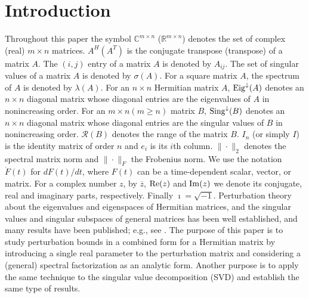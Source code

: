 \documentclass[11pt,a4paper]{article}
\numberwithin{equation}{section}
\begin{document}
\section{Introduction} Throughout this paper the symbol $\mathbb{C}^{m\times n}$ ($\mathbb{R}^{m\times n}$) denotes the set of complex (real) $m\times n$ matrices. $A^H (A^T)$ is the conjugate transpose (transpose) of a matrix $A$. The $(i,j)$ entry of a matrix $A$ is denoted by $A_{ij}$. The set of singular values of a matrix $A$ is denoted by $\sigma(A)$. For a square matrix $A$, the spectrum of $A$ is denoted by $\lambda(A)$.
For an $n\times n$ Hermitian matrix $A$, ${\rm Eig}^{\downarrow}(A)$ denotes an $n\times n$ diagonal matrix whose diagonal entries are the eigenvalues of $A$ in nonincreasing order. For an $m\times n (m\geq n)$ matrix $B$, ${\rm Sing}^{\downarrow}(B)$ denotes an $n\times n$ diagonal matrix whose diagonal entries are the singular values of $B$ in nonincreasing order.
$\mathcal R (B)$ denotes the range of the matrix $B$.
$I_n$ (or simply $I$) is the identity matrix of order $n$ and $e_i$ is its $i$th column. $\|\cdot\|_2$ denotes the spectral matrix norm and $\|\cdot\|_F$ the Frobenius norm.
We use the notation $\dot{F}(t)$ for $dF(t)/dt$, where $F(t)$ can be a time-dependent scalar, vector, or  matrix. For a complex number $z$, by $\overline{z}$, ${\rm Re}(z)$ and ${\rm Im}(z)$ we denote its conjugate, real and imaginary parts, respectively. Finally ${\imath} =\sqrt{-1}$.
\vskip 0.1in
Perturbation theory about the eigenvalues and eigenspaces of Hermitian matrices,
and the singular values and singular subspaces of general matrices has been well established, and many results have been published; e.g., see \cite{dk70,golv13,hw53,kat80,li07,s73,ss90,w72}. The purpose of this paper is to study  perturbation bounds in a combined form for a Hermitian matrix by introducing a single real parameter to the perturbation matrix and considering a (general) spectral  factorization as an analytic form.
Another purpose is to apply the same technique to the singular value decomposition (SVD)
and establish the same type of results.
\end{document}
